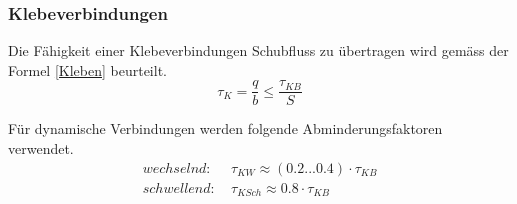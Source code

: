   \subsubsection{Klebeverbindungen}
  Die Fähigkeit einer Klebeverbindungen Schubfluss zu übertragen wird gemäss der Formel \ref{Kleben} beurteilt.
  \begin{equation}
    \label{Kleben}
    \tau_K = \frac{q}{b} \leq \frac{\tau_{KB}}{S}
  \end{equation}

  Für dynamische Verbindungen werden folgende Abminderungsfaktoren verwendet. \cite{klein}
  \begin{equation}
    \label{Zulässige Schubspannungen}
    \begin{split}
    wechselnd: & \: \tau_{KW} \approx \left (0.2 ... 0.4 \right ) \cdot \tau_{KB}\\
    schwellend: & \: \tau_{KSch} \approx 0.8 \cdot \tau_{KB}
    \end{split}
  \end{equation}

\newpage
